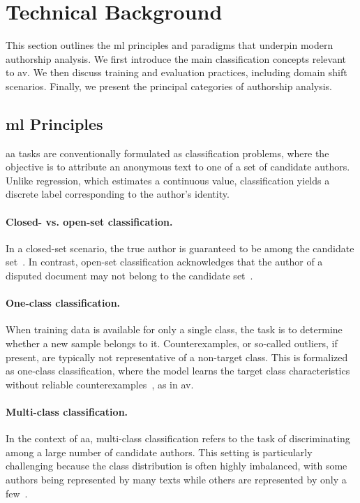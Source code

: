 \section{Technical Background}

This section outlines the \ac{ml} principles and paradigms that underpin modern authorship analysis. 
We first introduce the main classification concepts relevant to \ac{av}. 
We then discuss training and evaluation practices, including domain shift scenarios. 
Finally, we present the principal categories of authorship analysis.

\subsection{\acl{ml} Principles}

\ac{aa} tasks are conventionally formulated as classification problems, where the objective is to attribute an anonymous text to one of a set of candidate authors. 
Unlike regression, which estimates a continuous value, classification yields a discrete label corresponding to the author’s identity.

\paragraph{Closed- vs. open-set classification.} 
In a closed-set scenario, the true author is guaranteed to be among the candidate set~\citep{koppel_authorship_2011}. 
In contrast, open-set classification acknowledges that the author of a disputed document may not belong to the candidate set~\citep{stamatatos_survey_2009}. 

\paragraph{One-class classification.} 
When training data is available for only a single class, the task is to determine whether a new sample belongs to it. 
Counterexamples, or so-called outliers, if present, are typically not representative of a non-target class. 
This is formalized as one-class classification, where the model learns the target class characteristics without reliable counterexamples~\citep{stein_intrinsic_2011,koppel_authorship_2004}, as in \ac{av}.

\paragraph{Multi-class classification.} 
In the context of \ac{aa}, multi-class classification refers to the task of discriminating among a large number of candidate authors. 
This setting is particularly challenging because the class distribution is often highly imbalanced, with some authors being represented by many texts while others are represented by only a few~\citep{stamatatos_survey_2009,koppel_authorship_2004,elmanarelbouanani_authorship_2014}. 


